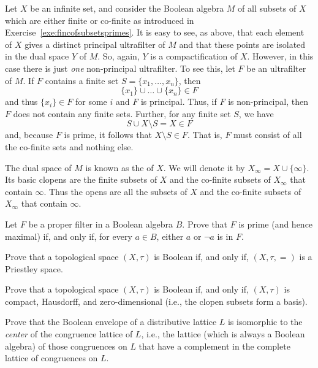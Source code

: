   \begin{example}\label{exa:fincofsubsetsdual}
  Let $X$ be an infinite set, and consider the Boolean algebra $M$ of all subsets of $X$ which are either finite or co-finite as introduced in Exercise~\ref{exe:fincofsubsetsprimes}. It is easy to see, as above, that each element of $X$ gives a distinct principal ultrafilter of $M$ and that these points are isolated in the dual space $Y$ of $M$. So, again, $Y$ is a compactification of $X$. However, in this case there is just \emph{one} non-principal ultrafilter. To see this, let $F$ be an ultrafilter of $M$. If $F$ contains a finite set $S=\{x_1,\dots, x_n\}$, then
  \[
  \{x_1\}\cup\dots\cup\{x_n\}\in F
  \] 
  and thus $\{x_i\}\in F$ for some $i$ and $F$ is principal. Thus, if $F$ is non-principal, then $F$ does not contain any finite sets. Further, for any finite set $S$, we have
  \[
  S\cup X\setminus S=X\in F
  \]
  and, because $F$ is prime, it follows that $X\setminus S\in F$. That is, $F$ must consist of all the co-finite sets and nothing else.
  
  The dual space of $M$ is known as the  of $X$. We will denote it by $X_\infty=X\cup\{\infty\}$. 
  Its basic clopens are the finite subsets of $X$ and the co-finite subsets of $X_\infty$ that contain $\infty$. Thus the opens are all the subsets of $X$ and the co-finite subsets of $X_\infty$ that contain $\infty$.
  \end{example}
  

\exercises

\exercise \label{exe:ultra-altchar}
Let $F$ be a proper filter in a Boolean algebra $B$. Prove that $F$ is prime (and hence maximal) if, and only if, for every $a \in B$, either $a$ or $\neg a$ is in $F$. 

\exercise \label{exe:Booleanspace}
Prove that a topological space $(X,\tau)$ is Boolean if, and only if, $(X,\tau,=)$ is a Priestley space.

\exercise \label{exe:zerodimensional}
Prove that a topological space $(X,\tau)$ is Boolean if, and only if, $(X,\tau)$ is compact, Hausdorff, and zero-dimensional (i.e., the clopen subsets form a basis).

\exercise \label{exe:compactcons-is-boolenv}
Prove that the Boolean envelope of a distributive lattice $L$ is isomorphic to the \emph{center} of the congruence lattice of $L$, i.e., the lattice (which is always a Boolean algebra) of those congruences on $L$ that have a complement in the complete lattice of congruences on $L$.

